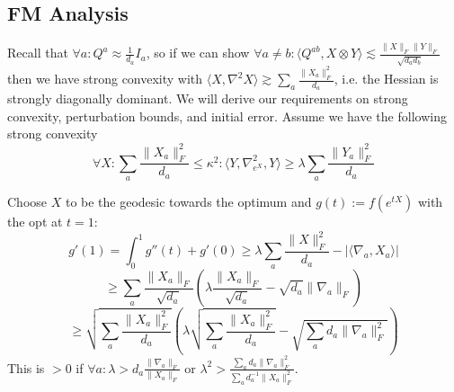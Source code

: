 \documentclass{article}
\begin{document}
\subsection{FM Analysis}
Recall that $\forall a: Q^{a} \approx \frac{1}{d_{a}} I_{a}$, so if we can show $\forall a \neq b: \langle Q^{ab}, X \otimes Y \rangle \lesssim \frac{\|X\|_{F} \|Y\|_{F}}{\sqrt{d_{a} d_{b}}}$ then we have strong convexity with $\langle X, \nabla^{2} X \rangle \gtrsim \sum_{a} \frac{\|X_{a}\|_{F}^{2}}{d_{a}}$, i.e. the Hessian is strongly diagonally dominant. We will derive our requirements on strong convexity, perturbation bounds, and initial error. Assume we have the following strong convexity 
\[ \forall X: \sum_{a} \frac{\|X_{a}\|_{F}^{2}}{d_{a}} \leq \kappa^{2}: \langle Y, \nabla^{2}_{e^{X}}, Y \rangle \geq \lambda \sum_{a} \frac{\|Y_{a}\|_{F}^{2}}{d_{a}}  \]

Choose $X$ to be the geodesic towards the optimum and $g(t) := f(e^{tX})$ with the opt at $t=1$:
\[ g'(1) = \int_{0}^{1} g''(t) + g'(0) \geq \lambda \sum_{a} \frac{\|X\|_{F}^{2}}{d_{a}} - |\langle \nabla_{a}, X_{a} \rangle| \]
\[ \geq \sum_{a} \frac{\|X_{a}\|_{F}}{\sqrt{d_{a}}} \left( \lambda \frac{\|X_{a}\|_{F}}{\sqrt{d_{a}}} - \sqrt{d_{a}} \|\nabla_{a}\|_{F}  \right)  \]
\[ \geq \sqrt{\sum_{a} \frac{\|X_{a}\|_{F}^{2}}{d_{a}}} \left( \lambda \sqrt{\sum_{a} \frac{\|X_{a}\|_{F}^{2}}{d_{a}}} - \sqrt{\sum_{a} d_{a} \|\nabla_{a}\|_{F}^{2}} \right)  \]
This is $> 0$ if $\forall a: \lambda > d_{a} \frac{\|\nabla_{a}\|_{F}}{\|X_{a}\|_{F}}$ or $\lambda^{2} > \frac{ \sum_{a} d_{a} \|\nabla_{a}\|_{F}^{2} }{\sum_{a} d_{a}^{-1} \|X_{a}\|_{F}^{2}} $. 
\end{document}

